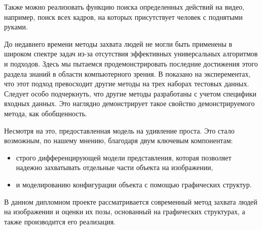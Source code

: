 Также можно реализовать функцию поиска определенных действий на видео, например, поиск всех кадров, на которых присутствует человек с поднятыми руками.

До недавнего времени методы захвата людей не могли быть применены в широком спектре задач из-за отсутствия эффективных универсальных алгоритмов и подходов. Здесь мы пытаемся продемонстрировать последние достижения этого раздела знаний в области компьютерного зрения. В \cite{andriluka09} показано на эксперементах, что этот подход превосходит другие методы на трех наборах тестовых данных. Следует особо подчеркнуть, что другие методы разработаны с учетом специфики входных данных. Это наглядно демонстрирует такое свойство демонстрируемого метода, как обобщенность.

Несмотря на это, предоставленная модель на удивление проста. Это стало возможным, по нашему мнению, благодаря двум ключевым компонентам:
\begin{itemize}
  \item строго дифференцирующей модели представления, которая позволяет надежно захватывать отдельные части объекта на изображении,
  \item и моделированию конфигурации объекта с помощью графических структур.
\end{itemize}

В данном дипломном проекте рассматривается современный метод захвата людей на изображении и оценки их позы, основанный на графических структурах, а также производится его реализация.

\newpage

